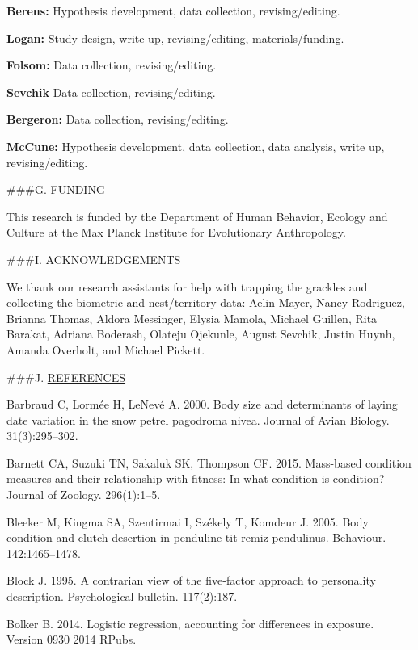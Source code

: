 \documentclass[
]{article}
\begin{document}
\textbf{Berens:} Hypothesis development, data collection,
revising/editing.

\textbf{Logan:} Study design, write up, revising/editing,
materials/funding.

\textbf{Folsom:} Data collection, revising/editing.

\textbf{Sevchik} Data collection, revising/editing.

\textbf{Bergeron:} Data collection, revising/editing.

\textbf{McCune:} Hypothesis development, data collection, data analysis,
write up, revising/editing.

\#\#\#G. FUNDING

This research is funded by the Department of Human Behavior, Ecology and
Culture at the Max Planck Institute for Evolutionary Anthropology.

\#\#\#I. ACKNOWLEDGEMENTS

We thank our research assistants for help with trapping the grackles and
collecting the biometric and nest/territory data: Aelin Mayer, Nancy
Rodriguez, Brianna Thomas, Aldora Messinger, Elysia Mamola, Michael
Guillen, Rita Barakat, Adriana Boderash, Olateju Ojekunle, August
Sevchik, Justin Huynh, Amanda Overholt, and Michael Pickett.

\#\#\#J. \href{MyLibrary.bib}{REFERENCES}

\hypertarget{refs}{}
\leavevmode\hypertarget{ref-barbraud2000body}{}%
Barbraud C, Lormée H, LeNevé A. 2000. Body size and determinants of
laying date variation in the snow petrel pagodroma nivea. Journal of
Avian Biology. 31(3):295--302.

\leavevmode\hypertarget{ref-barnett2015mass}{}%
Barnett CA, Suzuki TN, Sakaluk SK, Thompson CF. 2015. Mass-based
condition measures and their relationship with fitness: In what
condition is condition? Journal of Zoology. 296(1):1--5.

\leavevmode\hypertarget{ref-bleeker2005body}{}%
Bleeker M, Kingma SA, Szentirmai I, Székely T, Komdeur J. 2005. Body
condition and clutch desertion in penduline tit remiz pendulinus.
Behaviour. 142:1465--1478.

\leavevmode\hypertarget{ref-block1995contrarian}{}%
Block J. 1995. A contrarian view of the five-factor approach to
personality description. Psychological bulletin. 117(2):187.

\leavevmode\hypertarget{ref-bolker2014logistic}{}%
Bolker B. 2014. Logistic regression, accounting for differences in
exposure. Version 0930 2014 RPubs.
\end{document}
